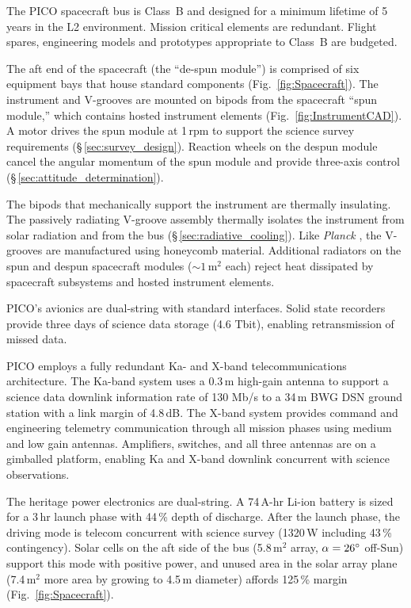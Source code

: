 The PICO spacecraft bus is Class~B and designed for a minimum lifetime of 5\,years in the L2
environment. Mission critical elements are redundant. Flight spares,
engineering models and prototypes appropriate to Class~B are budgeted.

The aft end of the spacecraft (the ``de-spun module'') is comprised of
six equipment bays that house standard components
(Fig.~\ref{fig:Spacecraft}).  The instrument and V-grooves are mounted on
bipods from the spacecraft ``spun module,'' which contains hosted
instrument elements (Fig.~\ref{fig:InstrumentCAD}). A motor drives the
spun module at 1\,rpm to support the science survey requirements
(\S\,\ref{sec:survey_design}). Reaction wheels on the despun module
cancel the angular momentum of the spun module and provide three-axis
control (\S\,\ref{sec:attitude_determination}).

The bipods that mechanically support the instrument are thermally
insulating. The passively radiating V-groove assembly thermally
isolates the instrument from solar radiation and from the bus
(\S\,\ref{sec:radiative_cooling}). Like \textit{Planck} \citep{Tauber2010}, the V-grooves are
manufactured using honeycomb material. Additional radiators on the
spun and despun spacecraft modules ($\sim1$\,m$^2$ each) reject heat
dissipated by spacecraft subsystems and hosted instrument elements.

PICO's avionics are dual-string with standard interfaces. Solid state
recorders provide three days of science data storage (4.6 Tbit), enabling
retransmission of missed data.

PICO employs a fully redundant Ka- and X-band telecommunications
architecture. The Ka-band system uses a 0.3\,m high-gain antenna to
support a science data downlink information rate of 130 Mb/s to a
34\,m BWG DSN ground station with a link margin of 4.8\,dB. The X-band
system provides command and engineering telemetry communication
through all mission phases using medium and low gain
antennas. Amplifiers, switches, and all three antennas are on a
gimballed platform, enabling Ka and X-band downlink concurrent with
science observations.

 The heritage power electronics are dual-string.
A 74\,A-hr Li-ion battery is sized for a 3\,hr launch phase with 44\,\% depth of discharge.
After the launch phase, the driving
mode is telecom concurrent with science survey (1320\,W including 43\,\% contingency).
Solar cells on the aft side of the bus (5.8\,m$^2$ array, $\alpha=26^\circ$ off-Sun) support this mode with positive power,  and unused area in the solar array plane (7.4\,m$^2$ more area by growing to 4.5\,m diameter) affords 125\,\% margin
(Fig.~\ref{fig:Spacecraft}).

